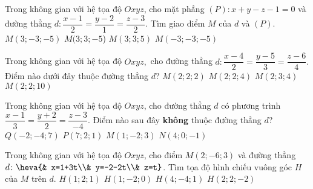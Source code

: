	\begin{ex}%
	Trong không gian với hệ tọa độ $Oxyz$, cho mặt phẳng $(P): x+y-z-1=0$ và đường thẳng $d:\dfrac{x-1}{2}=\dfrac{y-2}{1}=\dfrac{z-3}{2}$. Tìm giao điểm $M$ của $d$ và $(P)$.
	\choice 
	{$M(3;-3;-5)$}
	{$M(3;3;-5$)}
	{\True $M(3;3;5)$}
	{$M(-3;-3;-5)$} 
	\end{ex} 
	\begin{ex}%
	Trong không gian với hệ tọa độ $Oxyz,$ cho đường thẳng $d:\dfrac{x-4}{2}=\dfrac{y-5}{3}=\dfrac{z-6}{4}.$ Điểm nào dưới đây thuộc đường thẳng $d$?
	\choice
	{\True $M\left(2;2;2\right)$}
	{$M\left(2;2;4\right)$}
	{$M\left(2;3;4\right)$}
	{$M\left(2;2;10\right)$}
	\end{ex}
	\begin{ex}%
	Trong không gian với hệ tọa độ $Oxyz$, cho đường thẳng $d$ có phương trình $\dfrac{x-1}{3}=\dfrac{y+2}{2}=\dfrac{z-3}{-4}$. Điểm nào sau đây \textbf{không} thuộc đường thẳng $d$?
	\choice
	{$Q\left(-2;-4;7\right)$}
	{\True $P\left(7;2;1\right)$}
	{$M\left(1;-2;3\right)$}
	{$N\left(4;0;-1\right)$}
	\end{ex}
	\begin{ex}%
	Trong không gian với hệ tọa độ $Oxyz$, cho điểm $M(2;-6;3)$ và đường thẳng $d\colon\heva{& x=1+3t\\& y=-2-2t\\& z=t}$. Tìm tọa độ hình chiếu vuông góc $H$ của $M$ trên $d$.
	\choice
	{$H(1;2;1)$}
	{$H(1;-2;0)$}
	{\True $H(4;-4;1)$}
	{$H(2;2;-2)$}
	\end{ex} 
